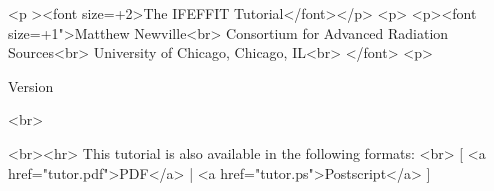 
\begin{htmlonly}
  \begin{rawhtml}
    <p ><font size=+2>The IFEFFIT Tutorial</font></p>
    <p>
    <p><font size=+1">Matthew Newville<br>
      Consortium for Advanced Radiation Sources<br>
      University of Chicago, Chicago, IL<br>
    </font>
    <p>
  \end{rawhtml}
  Version {\Vers}
  \begin{rawhtml}  <br> \end{rawhtml}
  {\update}
  \begin{rawhtml}  
    <br><hr>
    This tutorial is also available in the following formats: <br>
    [ <a href="tutor.pdf">PDF</a> | <a href="tutor.ps">Postscript</a> ]
  \end{rawhtml}
\end{htmlonly}

% 
